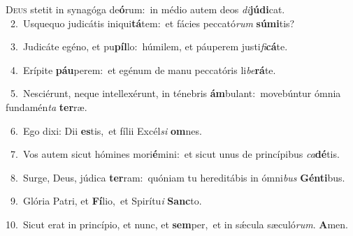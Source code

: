 \lettrine{\initial\textcolor{\initialcolor}{D}}{eus} stetit in synagóga de\-\textbf{ó}\-rum:~\star in médio autem deos \textit{di}\-\textbf{jú}\textbf{di}cat.\\
{\numbfont\textcolor{\numbcolor}{~2.}}~Usquequo judicátis iniqui\-\textbf{tá}\-tem:~\star et fácies peccató\textit{rum} \textbf{sú}\-\textbf{mi}tis?\par
{\numbfont\textcolor{\numbcolor}{~3.}}~Judicáte egéno, et pu\-\textbf{píl}\-lo:~\star húmilem, et páuperem justi\-\textit{fi}\-\textbf{cá}te.\par
{\numbfont\textcolor{\numbcolor}{~4.}}~Erípite \textbf{páu}\-perem:~\star et egénum de manu peccatóris li\-\textit{be}\-\textbf{rá}te.\par
{\numbfont\textcolor{\numbcolor}{~5.}}~Nesciérunt, neque intellexérunt, in ténebris \textbf{ám}\-bulant:~\star movebúntur ómnia fundamén\textit{ta} \textbf{ter}\-ræ.\par
{\numbfont\textcolor{\numbcolor}{~6.}}~Ego dixi: Dii \textbf{es}\-tis,~\star et fílii Excél\textit{si} \textbf{om}\-nes.\par
{\numbfont\textcolor{\numbcolor}{~7.}}~Vos autem sicut hómines mori\-\textbf{é}\-mini:~\star et sicut unus de princípibus \textit{ca}\-\textbf{dé}tis.\par
{\numbfont\textcolor{\numbcolor}{~8.}}~Surge, Deus, júdica \textbf{ter}\-ram:~\star quóniam tu hereditábis in ómni\textit{bus} \textbf{Gén}\-\textbf{ti}bus.\par
{\numbfont\textcolor{\numbcolor}{~9.}}~Glória Patri, et \textbf{Fí}\-lio,~\star et Spirítu\textit{i} \textbf{Sanc}\-to.\par
{\numbfont\textcolor{\numbcolor}{10.}}~Sicut erat in princípio, et nunc, et \textbf{sem}\-per,~\star et in sǽcula sæculó\-\textit{rum}\-. \textbf{A}\-men.\par

